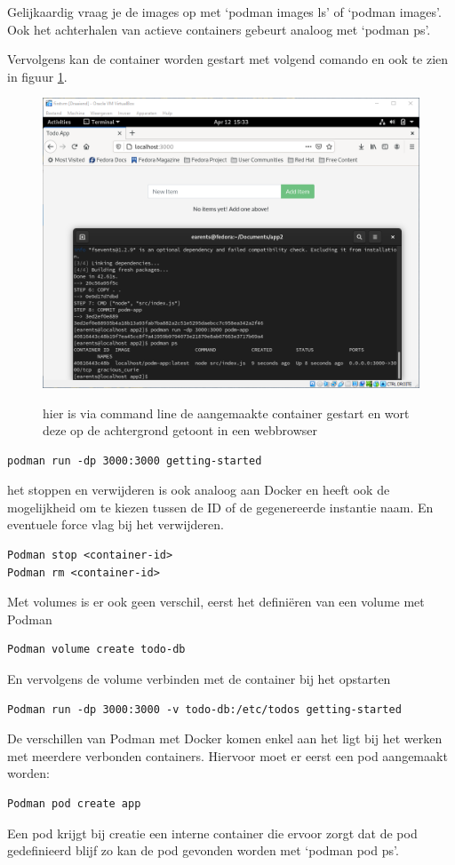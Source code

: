 Gelijkaardig vraag je de images op met `podman images ls' of `podman images'. Ook het achterhalen van actieve containers gebeurt analoog met `podman ps'.

Vervolgens kan de container worden gestart met volgend comando en ook te zien in figuur \ref{fig:podmanrun}. 
\begin{figure}[h]
    \includegraphics[width=\linewidth]{img/podmanrun.png}
    \label{fig:podmanrun}
    \caption[Podman die een web ap uitvoert]{hier is via command line de aangemaakte container gestart en wort deze op de achtergrond getoont in een webbrowser}
    \centering
\end{figure}
\begin{verbatim}
podman run -dp 3000:3000 getting-started
\end{verbatim}
het stoppen en verwijderen is ook analoog aan Docker en heeft ook de mogelijkheid om te kiezen tussen de ID of de gegenereerde instantie naam. En eventuele force vlag bij het verwijderen.
\begin{verbatim}
Podman stop <container-id>
Podman rm <container-id>
\end{verbatim}
Met volumes is er ook geen verschil, eerst het definiëren van een volume met Podman
\begin{verbatim}
Podman volume create todo-db
\end{verbatim}
En vervolgens de volume verbinden met de container bij het opstarten
\begin{verbatim}
Podman run -dp 3000:3000 -v todo-db:/etc/todos getting-started
\end{verbatim}
De verschillen van Podman met Docker komen enkel aan het ligt bij het werken met meerdere verbonden containers. Hiervoor moet er eerst een pod aangemaakt worden:
\begin{verbatim}
Podman pod create app
\end{verbatim}
Een pod krijgt bij creatie een interne container die ervoor zorgt dat de pod gedefinieerd blijf zo kan de pod gevonden worden met ‘podman pod ps’.

